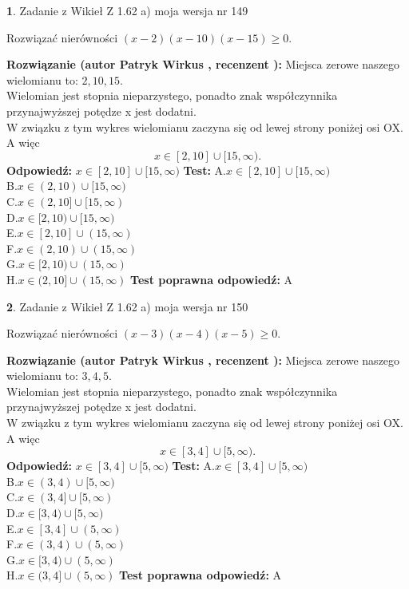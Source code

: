 \documentclass[12pt, a4paper]{article}
\theoremstyle{definition} %
\newtheorem{zad}{}
\newcommand{\zadStart}[1]{\begin{zad}#1\newline}
\newcommand{\zadStop}{\end{zad}}
\newcommand{\rozwStart}[2]{\noindent \textbf{Rozwiązanie (autor #1 , recenzent #2): }\newline}
\newcommand{\rozwStop}{\newline}
\newcommand{\odpStart}{\noindent \textbf{Odpowiedź:}\newline}
\newcommand{\odpStop}{\newline}
\newcommand{\testStart}{\noindent \textbf{Test:}\newline}
\newcommand{\testStop}{\newline}
\newcommand{\kluczStart}{\noindent \textbf{Test poprawna odpowiedź:}\newline}
\newcommand{\kluczStop}{\newline}
\begin{document}
\zadStart{Zadanie z Wikieł Z 1.62 a) moja wersja nr 149}

Rozwiązać nierówności $(x-2)(x-10)(x-15)\ge0$.
\zadStop
\rozwStart{Patryk Wirkus}{}
Miejsca zerowe naszego wielomianu to: $2, 10, 15$.\\
Wielomian jest stopnia nieparzystego, ponadto znak współczynnika przy\linebreak najwyższej potędze x jest dodatni.\\ W związku z tym wykres wielomianu zaczyna się od lewej strony poniżej osi OX. A więc $$x \in [2,10] \cup [15,\infty).$$
\rozwStop
\odpStart
$x \in [2,10] \cup [15,\infty)$
\odpStop
\testStart
A.$x \in [2,10] \cup [15,\infty)$\\
B.$x \in (2,10) \cup [15,\infty)$\\
C.$x \in (2,10] \cup [15,\infty)$\\
D.$x \in [2,10) \cup [15,\infty)$\\
E.$x \in [2,10] \cup (15,\infty)$\\
F.$x \in (2,10) \cup (15,\infty)$\\
G.$x \in [2,10) \cup (15,\infty)$\\
H.$x \in (2,10] \cup (15,\infty)$
\testStop
\kluczStart
A
\kluczStop



\zadStart{Zadanie z Wikieł Z 1.62 a) moja wersja nr 150}

Rozwiązać nierówności $(x-3)(x-4)(x-5)\ge0$.
\zadStop
\rozwStart{Patryk Wirkus}{}
Miejsca zerowe naszego wielomianu to: $3, 4, 5$.\\
Wielomian jest stopnia nieparzystego, ponadto znak współczynnika przy\linebreak najwyższej potędze x jest dodatni.\\ W związku z tym wykres wielomianu zaczyna się od lewej strony poniżej osi OX. A więc $$x \in [3,4] \cup [5,\infty).$$
\rozwStop
\odpStart
$x \in [3,4] \cup [5,\infty)$
\odpStop
\testStart
A.$x \in [3,4] \cup [5,\infty)$\\
B.$x \in (3,4) \cup [5,\infty)$\\
C.$x \in (3,4] \cup [5,\infty)$\\
D.$x \in [3,4) \cup [5,\infty)$\\
E.$x \in [3,4] \cup (5,\infty)$\\
F.$x \in (3,4) \cup (5,\infty)$\\
G.$x \in [3,4) \cup (5,\infty)$\\
H.$x \in (3,4] \cup (5,\infty)$
\testStop
\kluczStart
A
\kluczStop
\end{document}

